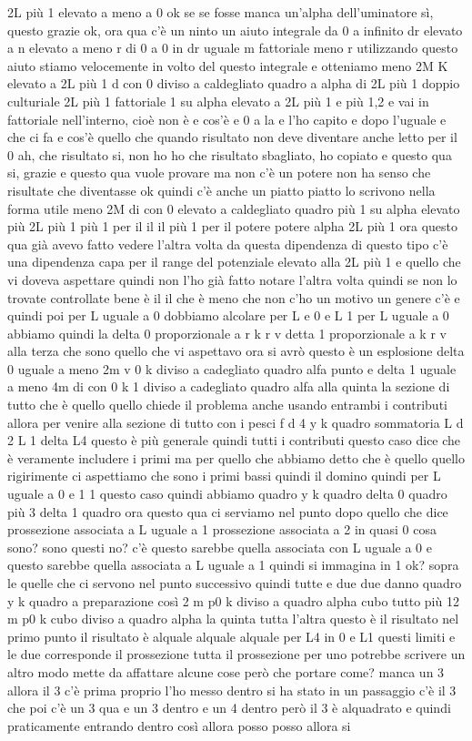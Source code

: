 \begin{soluzione}
{   2L più 1 elevato a meno a 0 ok se se fosse manca un'alpha dell'uminatore sì, questo grazie ok, ora qua c'è un ninto un aiuto integrale da 0 a infinito dr elevato a n elevato a meno r di 0 a 0 in dr uguale m fattoriale meno r utilizzando questo aiuto stiamo velocemente in volto del questo integrale e otteniamo meno 2M K elevato a 2L più 1 d con 0 diviso a caldegliato quadro a alpha di 2L più 1 doppio culturiale 2L più 1 fattoriale 1 su alpha elevato a 2L più 1 e più 1,2 e vai in fattoriale nell'interno, cioè non è e cos'è e 0 a la e l'ho capito e dopo l'uguale e che ci fa e cos'è quello che quando risultato non deve diventare anche letto per il 0 ah, che risultato si, non ho ho che risultato sbagliato, ho copiato e questo qua si, grazie e questo qua vuole provare ma non c'è un potere non ha senso che risultate che diventasse ok quindi c'è anche un piatto piatto lo scrivono nella forma utile meno 2M di con 0 elevato a caldegliato quadro più 1 su alpha elevato più 2L più 1 più 1 per il il il più 1 per il potere potere alpha 2L più 1 ora questo qua già avevo fatto vedere l'altra volta da questa dipendenza di questo tipo c'è una dipendenza capa per il range del potenziale elevato alla 2L più 1 e quello che vi doveva aspettare quindi non l'ho già fatto notare l'altra volta quindi se non lo trovate controllate bene è il il che è meno che non c'ho un motivo un genere c'è e quindi poi per L uguale a 0 dobbiamo alcolare per L e 0 e L 1 per L uguale a 0 abbiamo quindi la delta 0 proporzionale a r k r v detta 1 proporzionale a k r v alla terza che sono quello che vi aspettavo ora si avrò questo è un esplosione delta 0 uguale a meno 2m v 0 k diviso a cadegliato quadro alfa punto e delta 1 uguale a meno 4m di con 0 k 1 diviso a cadegliato quadro alfa alla quinta la sezione di tutto che è quello quello chiede il problema anche usando entrambi i contributi allora per venire alla sezione di tutto con i pesci f d 4 y k quadro sommatoria L d 2 L 1 delta L4 questo è più generale quindi tutti i contributi questo caso dice che è veramente includere i primi ma per quello che abbiamo detto che è quello quello rigirimente ci aspettiamo che sono i primi bassi quindi il domino quindi per L uguale a 0 e 1 1 questo caso quindi abbiamo quadro y k quadro delta 0 quadro più 3 delta 1 quadro ora questo qua ci serviamo nel punto dopo quello che dice prossezione associata a L uguale a 1 prossezione associata a 2 in quasi 0 cosa sono? sono questi no? c'è questo sarebbe quella associata con L uguale a 0 e questo sarebbe quella associata a L uguale a 1 quindi si immagina in 1 ok? sopra le quelle che ci servono nel punto successivo quindi tutte e due due danno quadro y k quadro a preparazione così 2 m p0 k diviso a quadro alpha cubo tutto più 12 m p0 k cubo diviso a quadro alpha la quinta tutta l'altra questo è il risultato nel primo punto il risultato è alquale alquale alquale per L4 in 0 e L1 questi limiti e le due corresponde il prossezione tutta il prossezione per uno potrebbe scrivere un altro modo mette da affattare alcune cose però che portare come? manca un 3 allora il 3 c'è prima proprio l'ho messo dentro si ha stato in un passaggio c'è il 3 che poi c'è un 3 qua e un 3 dentro e un 4 dentro però il 3 è alquadrato e quindi praticamente entrando dentro così allora posso posso allora si }
\end{soluzione}
